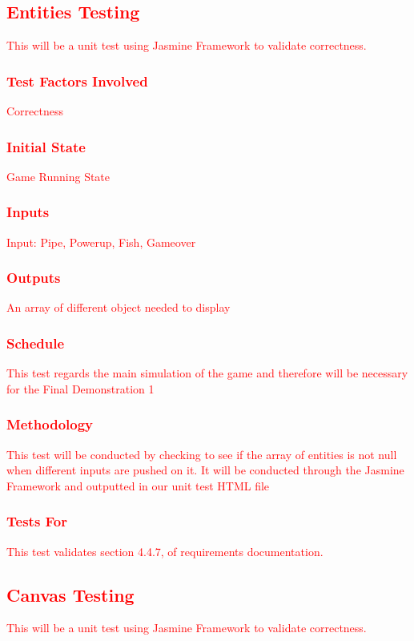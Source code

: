 \documentclass[11pt, oneside]{article}   	%
\begin{document}
\subsection{\textcolor{red}{Entities Testing}}
\textcolor{red}{This will be a unit test using Jasmine Framework to validate correctness.}
\subsubsection{\textcolor{red}{Test Factors Involved}}
\textcolor{red}{Correctness}
\subsubsection{\textcolor{red}{Initial State}}
\textcolor{red}{Game Running State}
\subsubsection{\textcolor{red}{Inputs}}
\textcolor{red}{Input: Pipe, Powerup, Fish, Gameover}
\subsubsection{\textcolor{red}{Outputs}}
\textcolor{red}{An array of different object needed to display}
\subsubsection{\textcolor{red}{Schedule}}
\textcolor{red}{This test regards the main simulation of the game and therefore will be necessary for the Final Demonstration 1}
\subsubsection{\textcolor{red}{Methodology}}
\textcolor{red}{This test will be conducted by checking to see if the array of entities is not null when different inputs are pushed on it. It will be conducted through the Jasmine Framework and outputted in our unit test HTML file}
\subsubsection{\textcolor{red}{Tests For}}
\textcolor{red}{This test validates section 4.4.7, of requirements documentation.}


\subsection{\textcolor{red}{Canvas Testing}}
\textcolor{red}{This will be a unit test using Jasmine Framework to validate correctness.}
\end{document}
